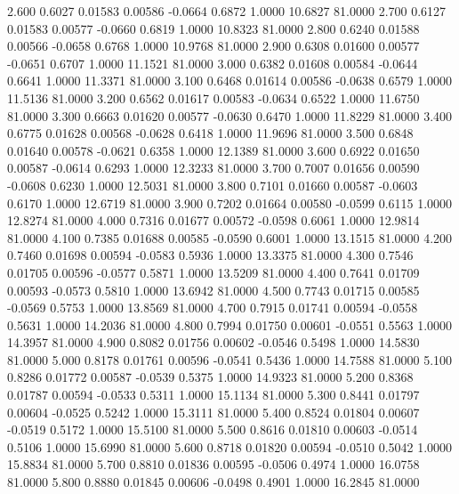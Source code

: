    2.600   0.6027   0.01583   0.00586  -0.0664   0.6872   1.0000  10.6827  81.0000
   2.700   0.6127   0.01583   0.00577  -0.0660   0.6819   1.0000  10.8323  81.0000
   2.800   0.6240   0.01588   0.00566  -0.0658   0.6768   1.0000  10.9768  81.0000
   2.900   0.6308   0.01600   0.00577  -0.0651   0.6707   1.0000  11.1521  81.0000
   3.000   0.6382   0.01608   0.00584  -0.0644   0.6641   1.0000  11.3371  81.0000
   3.100   0.6468   0.01614   0.00586  -0.0638   0.6579   1.0000  11.5136  81.0000
   3.200   0.6562   0.01617   0.00583  -0.0634   0.6522   1.0000  11.6750  81.0000
   3.300   0.6663   0.01620   0.00577  -0.0630   0.6470   1.0000  11.8229  81.0000
   3.400   0.6775   0.01628   0.00568  -0.0628   0.6418   1.0000  11.9696  81.0000
   3.500   0.6848   0.01640   0.00578  -0.0621   0.6358   1.0000  12.1389  81.0000
   3.600   0.6922   0.01650   0.00587  -0.0614   0.6293   1.0000  12.3233  81.0000
   3.700   0.7007   0.01656   0.00590  -0.0608   0.6230   1.0000  12.5031  81.0000
   3.800   0.7101   0.01660   0.00587  -0.0603   0.6170   1.0000  12.6719  81.0000
   3.900   0.7202   0.01664   0.00580  -0.0599   0.6115   1.0000  12.8274  81.0000
   4.000   0.7316   0.01677   0.00572  -0.0598   0.6061   1.0000  12.9814  81.0000
   4.100   0.7385   0.01688   0.00585  -0.0590   0.6001   1.0000  13.1515  81.0000
   4.200   0.7460   0.01698   0.00594  -0.0583   0.5936   1.0000  13.3375  81.0000
   4.300   0.7546   0.01705   0.00596  -0.0577   0.5871   1.0000  13.5209  81.0000
   4.400   0.7641   0.01709   0.00593  -0.0573   0.5810   1.0000  13.6942  81.0000
   4.500   0.7743   0.01715   0.00585  -0.0569   0.5753   1.0000  13.8569  81.0000
   4.700   0.7915   0.01741   0.00594  -0.0558   0.5631   1.0000  14.2036  81.0000
   4.800   0.7994   0.01750   0.00601  -0.0551   0.5563   1.0000  14.3957  81.0000
   4.900   0.8082   0.01756   0.00602  -0.0546   0.5498   1.0000  14.5830  81.0000
   5.000   0.8178   0.01761   0.00596  -0.0541   0.5436   1.0000  14.7588  81.0000
   5.100   0.8286   0.01772   0.00587  -0.0539   0.5375   1.0000  14.9323  81.0000
   5.200   0.8368   0.01787   0.00594  -0.0533   0.5311   1.0000  15.1134  81.0000
   5.300   0.8441   0.01797   0.00604  -0.0525   0.5242   1.0000  15.3111  81.0000
   5.400   0.8524   0.01804   0.00607  -0.0519   0.5172   1.0000  15.5100  81.0000
   5.500   0.8616   0.01810   0.00603  -0.0514   0.5106   1.0000  15.6990  81.0000
   5.600   0.8718   0.01820   0.00594  -0.0510   0.5042   1.0000  15.8834  81.0000
   5.700   0.8810   0.01836   0.00595  -0.0506   0.4974   1.0000  16.0758  81.0000
   5.800   0.8880   0.01845   0.00606  -0.0498   0.4901   1.0000  16.2845  81.0000
